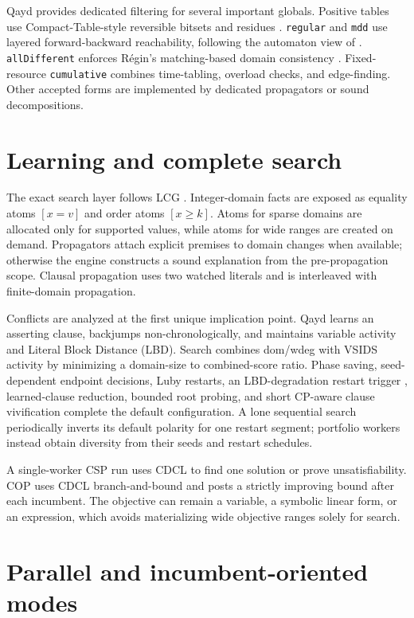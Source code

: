 \documentclass[10pt,letterpaper]{article}
\begin{document}
Qayd provides dedicated filtering for several important globals. Positive
tables use Compact-Table-style reversible bitsets and residues
\cite{compacttable}. \texttt{regular} and \texttt{mdd} use layered
forward-backward reachability, following the automaton view of
\cite{pesant}. \texttt{allDifferent} enforces R\'egin's matching-based domain
consistency \cite{regin}. Fixed-resource \texttt{cumulative} combines
time-tabling, overload checks, and edge-finding. Other accepted forms are
implemented by dedicated propagators or sound decompositions.

\section{Learning and complete search}

The exact search layer follows LCG \cite{lcg}. Integer-domain facts are exposed
as equality atoms $[x=v]$ and order atoms $[x\geq k]$. Atoms for sparse domains
are allocated only for supported values, while atoms for wide ranges are
created on demand. Propagators attach explicit premises to domain changes when
available; otherwise the engine constructs a sound explanation from the
pre-propagation scope. Clausal propagation uses two watched literals and is
interleaved with finite-domain propagation.

Conflicts are analyzed at the first unique implication point. Qayd learns an
asserting clause, backjumps non-chronologically, and maintains variable activity
and Literal Block Distance (LBD). Search combines dom/wdeg
\cite{domwdeg} with VSIDS activity by minimizing a domain-size to combined-score
ratio. Phase saving, seed-dependent endpoint decisions, Luby restarts, an
LBD-degradation restart trigger \cite{lbd}, learned-clause reduction, bounded
root probing, and short CP-aware clause vivification complete the default
configuration. A lone sequential search periodically inverts its default
polarity for one restart segment; portfolio workers instead obtain diversity
from their seeds and restart schedules.

A single-worker CSP run uses CDCL to find one solution or prove
unsatisfiability. COP uses CDCL branch-and-bound and posts a strictly improving
bound after each incumbent. The objective can remain a variable, a symbolic
linear form, or an expression, which avoids materializing wide objective
ranges solely for search.

\section{Parallel and incumbent-oriented modes}
\end{document}
